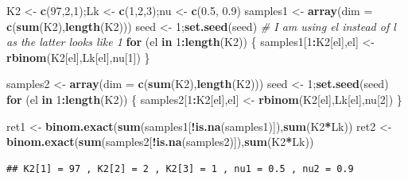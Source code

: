 \documentclass[
]{book}
\newenvironment{Shaded}{\begin{snugshade}}{\end{snugshade}}
\newcommand{\CommentTok}[1]{\textcolor[rgb]{0.56,0.35,0.01}{\textit{#1}}}
\newcommand{\ControlFlowTok}[1]{\textcolor[rgb]{0.13,0.29,0.53}{\textbf{#1}}}
\newcommand{\DataTypeTok}[1]{\textcolor[rgb]{0.13,0.29,0.53}{#1}}
\newcommand{\DecValTok}[1]{\textcolor[rgb]{0.00,0.00,0.81}{#1}}
\newcommand{\FloatTok}[1]{\textcolor[rgb]{0.00,0.00,0.81}{#1}}
\newcommand{\KeywordTok}[1]{\textcolor[rgb]{0.13,0.29,0.53}{\textbf{#1}}}
\newcommand{\NormalTok}[1]{#1}
\newcommand{\OperatorTok}[1]{\textcolor[rgb]{0.81,0.36,0.00}{\textbf{#1}}}
\newcommand{\StringTok}[1]{\textcolor[rgb]{0.31,0.60,0.02}{#1}}
\begin{document}
\begin{Shaded}
\begin{Highlighting}[]
\NormalTok{K2 <-}\StringTok{ }\KeywordTok{c}\NormalTok{(}\DecValTok{97}\NormalTok{,}\DecValTok{2}\NormalTok{,}\DecValTok{1}\NormalTok{);Lk <-}\StringTok{ }\KeywordTok{c}\NormalTok{(}\DecValTok{1}\NormalTok{,}\DecValTok{2}\NormalTok{,}\DecValTok{3}\NormalTok{);nu <-}\StringTok{ }\KeywordTok{c}\NormalTok{(}\FloatTok{0.5}\NormalTok{, }\FloatTok{0.9}\NormalTok{)}
\NormalTok{samples1 <-}\StringTok{ }\KeywordTok{array}\NormalTok{(}\DataTypeTok{dim =} \KeywordTok{c}\NormalTok{(}\KeywordTok{sum}\NormalTok{(K2),}\KeywordTok{length}\NormalTok{(K2)))}
\NormalTok{seed <-}\StringTok{ }\DecValTok{1}\NormalTok{;}\KeywordTok{set.seed}\NormalTok{(seed)}
\CommentTok{# I am using el instead of l as the latter looks like 1}
\ControlFlowTok{for}\NormalTok{ (el }\ControlFlowTok{in} \DecValTok{1}\OperatorTok{:}\KeywordTok{length}\NormalTok{(K2)) \{}
\NormalTok{  samples1[}\DecValTok{1}\OperatorTok{:}\NormalTok{K2[el],el] <-}\StringTok{ }\KeywordTok{rbinom}\NormalTok{(K2[el],Lk[el],nu[}\DecValTok{1}\NormalTok{])}
\NormalTok{\}}

\NormalTok{samples2 <-}\StringTok{ }\KeywordTok{array}\NormalTok{(}\DataTypeTok{dim =} \KeywordTok{c}\NormalTok{(}\KeywordTok{sum}\NormalTok{(K2),}\KeywordTok{length}\NormalTok{(K2)))}
\NormalTok{seed <-}\StringTok{ }\DecValTok{1}\NormalTok{;}\KeywordTok{set.seed}\NormalTok{(seed)}
\ControlFlowTok{for}\NormalTok{ (el }\ControlFlowTok{in} \DecValTok{1}\OperatorTok{:}\KeywordTok{length}\NormalTok{(K2)) \{}
\NormalTok{  samples2[}\DecValTok{1}\OperatorTok{:}\NormalTok{K2[el],el] <-}\StringTok{ }\KeywordTok{rbinom}\NormalTok{(K2[el],Lk[el],nu[}\DecValTok{2}\NormalTok{])}
\NormalTok{\}}

\NormalTok{ret1 <-}\StringTok{ }\KeywordTok{binom.exact}\NormalTok{(}\KeywordTok{sum}\NormalTok{(samples1[}\OperatorTok{!}\KeywordTok{is.na}\NormalTok{(samples1)]),}\KeywordTok{sum}\NormalTok{(K2}\OperatorTok{*}\NormalTok{Lk))}
\NormalTok{ret2 <-}\StringTok{ }\KeywordTok{binom.exact}\NormalTok{(}\KeywordTok{sum}\NormalTok{(samples2[}\OperatorTok{!}\KeywordTok{is.na}\NormalTok{(samples2)]),}\KeywordTok{sum}\NormalTok{(K2}\OperatorTok{*}\NormalTok{Lk))}
\end{Highlighting}
\end{Shaded}

\begin{verbatim}
## K2[1] = 97 , K2[2] = 2 , K2[3] = 1 , nu1 = 0.5 , nu2 = 0.9
\end{verbatim}
\end{document}
